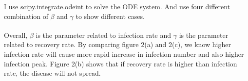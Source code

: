 \documentclass{article}
\begin{document}
\indent I use scipy.integrate.odeint to solve the ODE system. And use four different combination of $\beta$ and $\gamma$ to show different cases.\\
\\
\indent Overall, $\beta$ is the parameter related to infection rate and $\gamma$ is the parameter related to recovery rate. By comparing figure 2(a) and 2(c), we know higher infection rate will cause more rapid increase in infection number and also higher infection peak. Figure 2(b) shows that if recovery rate is higher than infection rate, the disease will not spread. 
\end{document}
